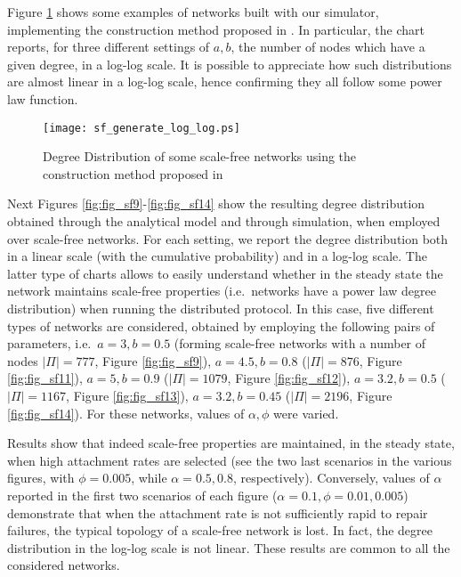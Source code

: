 \documentclass[a4paper,twosided]{article}
\begin{document}
Figure \ref{fig:fig_rete_Aiello} shows some examples of networks built with our simulator, implementing the construction method proposed in \cite{Aiello00arandom}. In particular, the chart reports, for three different settings of $a, b$, the number of nodes which have a given degree, in a log-log scale. It is possible to appreciate how such distributions are almost linear in a log-log scale, hence confirming they all follow some power law function.

\begin{figure}
   \centering
   \texttt{[image: sf\_generate\_log\_log.ps]}
   \caption{Degree Distribution of some scale-free networks using the construction method proposed in \cite{Aiello00arandom}}
   \label{fig:fig_rete_Aiello}
\end{figure}

Next Figures \ref{fig:fig_sf9}-\ref{fig:fig_sf14} show the resulting degree distribution obtained through the analytical model and through simulation, when employed over scale-free networks. For each setting, we report the degree distribution both in a linear scale (with the cumulative probability) and in a log-log scale. The latter type of charts allows to easily understand whether in the steady state the network maintains scale-free properties (i.e.~networks have a power law degree distribution) when running the distributed protocol.
In this case, five different types of networks are considered, obtained by employing the following pairs of parameters, i.e.~$a = 3, b= 0.5$ (forming scale-free networks with a number of nodes $|\Pi| = 777$, Figure \ref{fig:fig_sf9}), $a = 4.5, b= 0.8$ ($|\Pi| = 876$, Figure \ref{fig:fig_sf11}), $a = 5, b= 0.9$ ($|\Pi| = 1079$, Figure \ref{fig:fig_sf12}), $a = 3.2, b= 0.5$ ($|\Pi| = 1167$, Figure \ref{fig:fig_sf13}), $a = 3.2, b= 0.45$ ($|\Pi| = 2196$, Figure \ref{fig:fig_sf14}).
For these networks, values of $\alpha, \phi$ were varied.

Results show that indeed scale-free properties are maintained, in the steady state, when high attachment rates are selected
(see the two last scenarios in the various figures, with $\phi=0.005$, while $\alpha=0.5, 0.8$, respectively). Conversely, values of $\alpha$ reported in the first two scenarios of each figure ($\alpha=0.1, \phi=0.01, 0.005$) demonstrate that when the attachment rate is not sufficiently rapid to repair failures, the typical topology of a scale-free network is lost. In fact, the degree distribution in the log-log scale is not linear. These results are common to all the considered networks.
\end{document}
